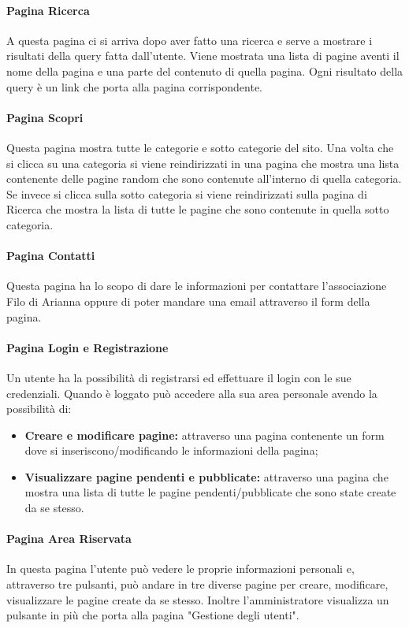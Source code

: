 \paragraph{Pagina Ricerca} A questa pagina ci si arriva dopo aver fatto una ricerca e serve a mostrare i risultati della query fatta dall'utente. Viene mostrata una lista di pagine aventi il nome della pagina e una parte del contenuto di quella pagina. Ogni risultato della query è un link che porta alla pagina corrispondente. 

\paragraph{Pagina Scopri} Questa pagina mostra tutte le categorie e sotto categorie del sito. Una volta che si clicca su una categoria si viene reindirizzati in una pagina che mostra una lista contenente delle pagine random che sono contenute all'interno di quella categoria. Se invece si clicca sulla sotto categoria si viene reindirizzati sulla pagina di Ricerca che mostra la lista di tutte le pagine che sono contenute in quella sotto categoria.

\paragraph{Pagina Contatti} Questa pagina ha lo scopo di dare le informazioni per contattare l'associazione Filo di Arianna oppure di poter mandare una email attraverso il form della pagina.

\paragraph{Pagina Login e Registrazione} Un utente ha la possibilità di registrarsi ed effettuare il login con le sue credenziali. Quando è loggato può accedere alla sua area personale avendo la possibilità di:
\begin{itemize}
	\item \textbf{Creare e modificare pagine:} attraverso una pagina contenente un form dove si inseriscono/modificando le informazioni della pagina;
	\item \textbf{Visualizzare pagine pendenti e pubblicate:} attraverso una pagina che mostra una lista di tutte le pagine pendenti/pubblicate che sono state create da se stesso.
\end{itemize}

\paragraph{Pagina Area Riservata} In questa pagina l'utente può vedere le proprie informazioni personali e, attraverso tre pulsanti, può andare in tre diverse pagine per creare, modificare, visualizzare le pagine create da se stesso. Inoltre l'amministratore visualizza un pulsante in più che porta alla pagina "Gestione degli utenti".

